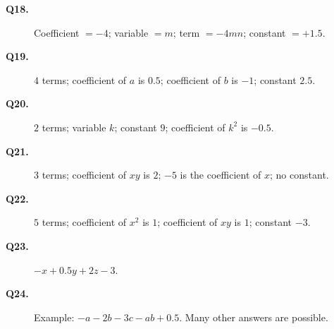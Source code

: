 \documentclass[12pt,a4paper]{article}
\begin{document}
\begin{description}
\item[\textbf{Q18.}] Coefficient \(=-4\); variable \(=m\); term \(=-4mn\); constant \(=+1.5\).
\item[\textbf{Q19.}] \(4\) terms; coefficient of \(a\) is \(0.5\); coefficient of \(b\) is \(-1\); constant \(2.5\).
\item[\textbf{Q20.}] \(2\) terms; variable \(k\); constant \(9\); coefficient of \(k^2\) is \(-0.5\).
\item[\textbf{Q21.}] \(3\) terms; coefficient of \(xy\) is \(2\); \(-5\) is the coefficient of \(x\); no constant.
\item[\textbf{Q22.}] \(5\) terms; coefficient of \(x^2\) is \(1\); coefficient of \(xy\) is \(1\); constant \(-3\).
\item[\textbf{Q23.}] \(-x+0.5y+2z-3\).
\item[\textbf{Q24.}] Example: \(-a-2b-3c-ab+0.5\). Many other answers are possible.

\end{description}
\end{document}
